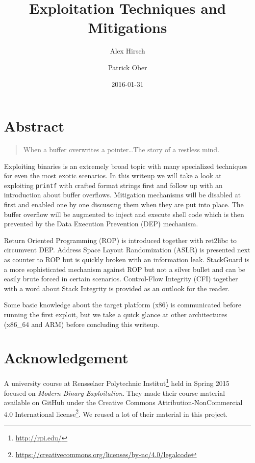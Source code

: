 \documentclass[article]{uibk}
\title{Exploitation Techniques and Mitigations}
\author{Alex Hirsch \and Patrick Ober}
\date{2016-01-31}
\begin{document}
\maketitle

\section*{Abstract}
\label{sec:abstract}

\begin{quote}
    When a buffer overwrites a pointer\dots\enspace The story of a restless
    mind.
\end{quote}

Exploiting binaries is an extremely broad topic with many specialized
techniques for even the most exotic scenarios. In this writeup we will take a
look at exploiting \texttt{printf} with crafted format strings first and follow
up with an introduction about buffer overflows. Mitigation mechanisms will be
disabled at first and enabled one by one discussing them when they are put into
place. The buffer overflow will be augmented to inject and execute shell code
which is then prevented by the Data Execution Prevention (DEP) mechanism.

Return Oriented Programming (ROP) is introduced together with ret2libc to
circumvent DEP. Address Space Layout Randomization (ASLR) is presented next as
counter to ROP but is quickly broken with an information leak. StackGuard is a
more sophisticated mechanism against ROP but not a silver bullet and can be
easily brute forced in certain scenarios. Control-Flow Integrity (CFI) together
with a word about Stack Integrity is provided as an outlook for the reader.

Some basic knowledge about the target platform (x86) is communicated before
running the first exploit, but we take a quick glance at other architectures
(x86\_64 and ARM) before concluding this writeup.

\setcounter{tocdepth}{1}
\tableofcontents

\newpage

\section*{Acknowledgement}

A university course at Rensselaer Polytechnic
Institut\footnote{\url{http://rpi.edu/}} held in Spring 2015 focused on
\textit{Modern Binary Exploitation}. They made their course material available
on GitHub \cite{rpisec} under the Creative Commons Attribution-NonCommercial
4.0 International
license\footnote{\url{https://creativecommons.org/licenses/by-nc/4.0/legalcode}}.
We reused a lot of their material in this project.
\end{document}
